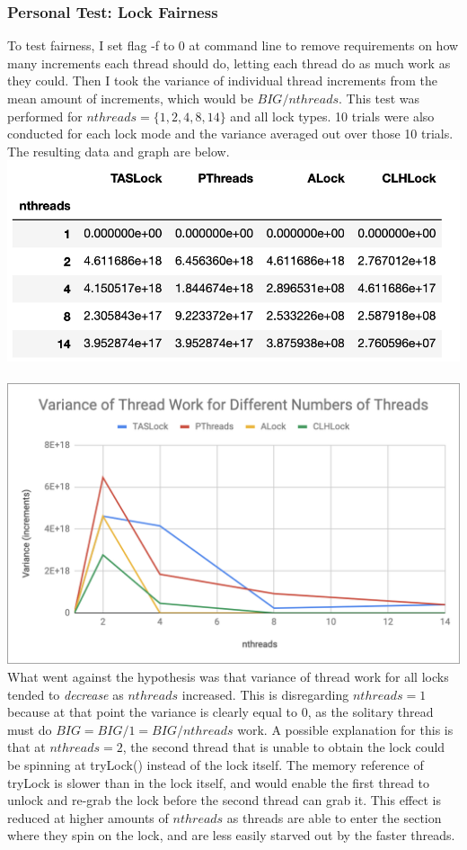 \documentclass{article}
\begin{document}
\begin{adjustwidth}{-2cm}{-2cm}
\subsubsection{Personal Test: Lock Fairness}
To test fairness, I set flag -f to 0 at command line to remove requirements on how many increments each thread should do, letting each thread do as much work as they could. Then I took the variance of individual thread increments from the mean amount of increments, which would be $BIG/nthreads$. This test was performed for $nthreads = \{1,2,4,8,14\}$  and all lock types. 10 trials were also conducted for each lock mode and the variance averaged out over those 10 trials. The resulting data and graph are below.\\
\includegraphics[width=\linewidth]{fairdata.png}\\
\null\\
\includegraphics[width=\linewidth]{fairgraph.png}\\
What went against the hypothesis was that variance of thread work for all locks tended to \textit{decrease} as $nthreads$ increased. This is disregarding $nthreads=1$ because at that point the variance is clearly equal to 0, as the solitary thread must do $BIG = BIG/1 = BIG/nthreads$ work. A possible explanation for this is that at $nthreads=2$, the second thread that is unable to obtain the lock could be spinning at tryLock() instead of the lock itself. The memory reference of tryLock is slower than in the lock itself, and would enable the first thread to unlock and re-grab the lock before the second thread can grab it. This effect is reduced at higher amounts of $nthreads$ as threads are able to enter the section where they spin on the lock, and are less easily starved out by the faster threads.\\

\end{adjustwidth}
\end{document}
